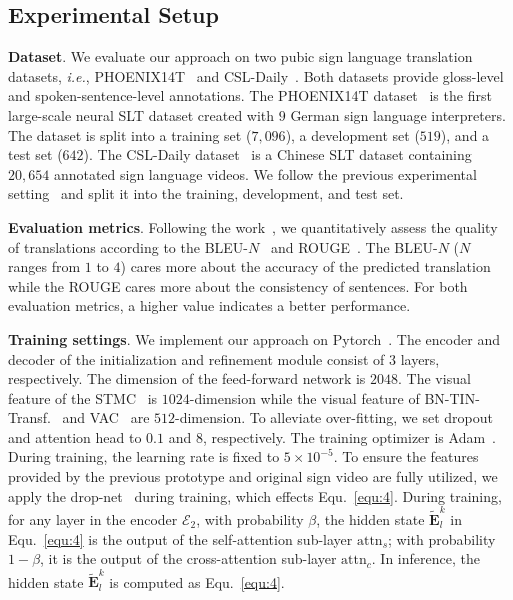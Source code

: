 \documentclass[10pt,twocolumn,letterpaper]{article}
\begin{document}
    \subsection{Experimental Setup}
    \smallskip
    \noindent \textbf{Dataset}.
    We evaluate our approach on two pubic sign language translation datasets, \emph{i.e.}, PHOENIX14T~\cite{camgoz2018neural} and CSL-Daily~\cite{zhou2021improving}. 
    Both datasets provide gloss-level and spoken-sentence-level annotations.
    The PHOENIX14T dataset~\cite{camgoz2018neural} is the first large-scale neural SLT dataset created with $9$ German sign language interpreters. 
    The dataset is split into a training set ($7,096$), a development set ($519$), and a test set ($642$).
    The CSL-Daily dataset~\cite{zhou2021improving} is a Chinese SLT dataset containing $20,654$ annotated sign language videos. We follow the previous experimental setting~\cite{zhou2021improving} and split it into the training, development, and test set.

    \smallskip
    \noindent \textbf{Evaluation metrics}.
    Following the work~\cite{zhou2021improving}, we quantitatively assess the quality of translations according to the BLEU-$N$~\cite{papineni2002bleu} and ROUGE~\cite{rouge2004package}.
    The BLEU-$N$ ($N$ ranges from $1$ to $4$) cares more about the accuracy of the predicted translation while the ROUGE cares more about the consistency of sentences. 
    For both evaluation metrics, a higher value indicates a better performance.
    
    \smallskip
    \noindent \textbf{Training settings}.
    We implement our approach on Pytorch~\cite{paszke2017automatic}. 
    The encoder and decoder of the initialization and refinement module consist of $3$ layers, respectively.
    The dimension of the feed-forward network is $2048$. 
    The visual feature of the STMC~\cite{zhou2021spatial} is $1024$-dimension while the visual feature of BN-TIN-Transf.~\cite{zhou2021improving} and VAC~\cite{min2021visual} are $512$-dimension.
    To alleviate over-fitting, we set dropout and attention head to $0.1$ and $8$, respectively. 
    The training optimizer is Adam~\cite{kingma2014adam}.
    During training, the learning rate is fixed to $5\times10^{-5}$. 
    To ensure the features provided by the previous prototype and original sign video are fully utilized, we apply the drop-net~\cite{zhu2020incorporating} during training, which effects Equ.~\eqref{equ:4}.
    During training, for any layer in the encoder $\mathcal{E}_2$, with probability $\beta$, the hidden state $\widetilde{\bm{E}}_l^{k}$ in Equ.~\eqref{equ:4} is the output of the self-attention sub-layer $\text{attn}_s$; with probability $1-\beta$, it is the output of the cross-attention sub-layer $\text{attn}_c$. 
    In inference, the hidden state $\widetilde{\bm{E}}_l^{k}$ is computed as Equ.~\eqref{equ:4}.
\end{document}
